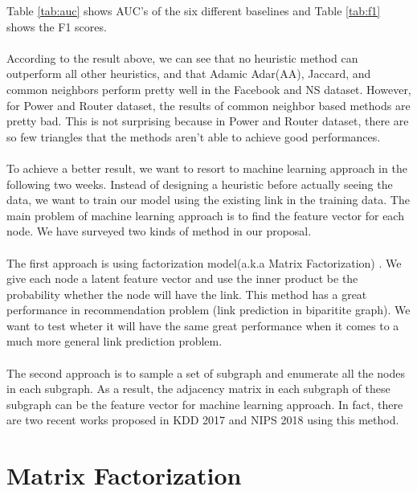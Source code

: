 \documentclass[12pt]{article}
\begin{document}
Table \ref{tab:auc} shows AUC's of the six different baselines and Table \ref{tab:f1} shows the F1 scores.
\\
\\
According to the result above, we can see that no heuristic method can outperform all other heuristics, and that Adamic Adar(AA), Jaccard, and common neighbors perform pretty well in the Facebook and NS dataset. However, for Power and Router dataset, the results of common neighbor based methods are pretty bad. This is not surprising because in Power and Router dataset, there are so few triangles that the methods aren't able to achieve good performances. 
\\
\\
To achieve a better result, we want to resort to machine learning approach in the following two weeks. Instead of designing a heuristic before actually seeing the data, we want to train our model using the existing link in the training data. The main problem of machine learning approach is to find the feature vector for each node. We have surveyed two kinds of method in our proposal. 
\\
\\
The first approach is using factorization model(a.k.a Matrix Factorization) \cite{mf}. We give each node a latent feature vector and use the inner product be the probability whether the node will have the link. This method has a great performance in recommendation problem (link prediction in biparitite graph). We want to test wheter it will have the same great performance when it comes to a much more general link prediction problem. 
\\
\\
The second approach is to sample a set of subgraph and enumerate all the nodes in each subgraph. As a result, the adjacency matrix in each subgraph of these subgraph can be the feature vector for machine learning approach. In fact, there are two recent works proposed in KDD 2017 \cite{lp2017} and NIPS 2018 \cite{lp2018} using this method. 

\section{Matrix Factorization}
\end{document}
